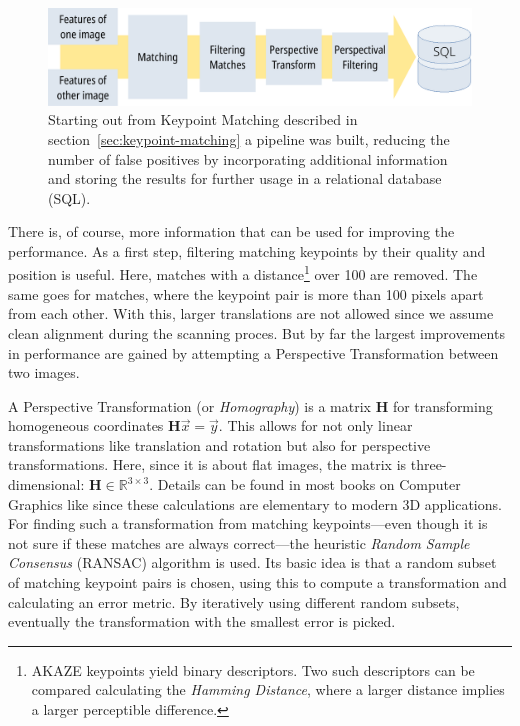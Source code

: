 \documentclass{ltjarticle}
\begin{document}
\begin{figure}
    \centering
    \includegraphics[width=\textwidth]{pipeline.pdf}
    \caption[Full processing pipeline]{Starting out from Keypoint Matching described in section~\ref{sec:keypoint-matching} a pipeline was built, reducing the number of false positives by incorporating additional information and storing the results for further usage in a relational database (SQL).}
    \label{fig:pipeline}
\end{figure}

There is, of course, more information that can be used for improving the performance. As a first step, filtering matching keypoints by their quality and position is useful. Here, matches with a distance\footnote{AKAZE keypoints yield binary descriptors. Two such descriptors can be compared calculating the \emph{Hamming Distance}, where a larger distance implies a larger perceptible difference.} over 100 are removed. The same goes for matches, where the keypoint pair is more than 100 pixels apart from each other. With this, larger translations are not allowed since we assume clean alignment during the scanning proces. But by far the largest improvements in performance are gained by attempting a Perspective Transformation between two images.

A Perspective Transformation (or \emph{Homography}) is a matrix $\mathbf{H}$ for transforming homogeneous coordinates $\mathbf{H}\vec{x} = \vec{y}$. This allows for not only linear transformations like translation and rotation but also for perspective transformations. Here, since it is about flat images, the matrix is three-dimensional: $\mathbf{H} \in \mathbb{R}^{3 \times 3}$. Details can be found in most books on Computer Graphics like \cite{marschner2015fundamentals} since these calculations are elementary to modern 3D applications. For finding such a transformation from matching keypoints---even though it is not sure if these matches are always correct---the heuristic \emph{Random Sample Consensus} (RANSAC) algorithm is used.\cite{fischler1981random} Its basic idea is that a random subset of matching keypoint pairs is chosen, using this to compute a transformation and calculating an error metric. By iteratively using different random subsets, eventually the transformation with the smallest error is picked. 
\end{document}
